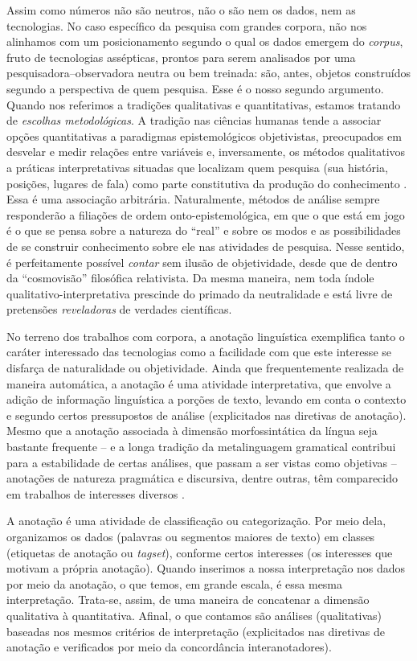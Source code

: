 \documentclass[portuguese]{textolivre}
\begin{document}
Assim como números não são neutros, não o são nem os dados, nem as tecnologias. No caso específico da pesquisa com grandes corpora, não nos alinhamos com um posicionamento segundo o qual os dados emergem do \textit{corpus}, fruto de tecnologias assépticas, prontos para serem analisados por uma pesquisadora–observadora neutra ou bem treinada: são, antes, objetos construídos segundo a perspectiva de quem pesquisa. Esse é o nosso segundo argumento. Quando nos referimos a tradições qualitativas e quantitativas, estamos tratando de \textit{escolhas metodológicas}. A tradição nas ciências humanas tende a associar opções quantitativas a paradigmas epistemológicos objetivistas, preocupados em desvelar e medir relações entre variáveis e, inversamente, os métodos qualitativos a práticas interpretativas situadas que localizam quem pesquisa (sua história, posições, lugares de fala) como parte constitutiva da produção do conhecimento \cite{denzin2006}. Essa é uma associação arbitrária. Naturalmente, métodos de análise sempre responderão a filiações de ordem onto-epistemológica, em que o que está em jogo é o que se pensa sobre a natureza do “real” e sobre os modos e as possibilidades de se construir conhecimento sobre ele nas atividades de pesquisa. Nesse sentido, é perfeitamente possível \textit{contar} sem ilusão de objetividade, desde que de dentro da “cosmovisão” filosófica relativista. Da mesma maneira, nem toda índole qualitativo-interpretativa prescinde do primado da neutralidade e está livre de pretensões \textit{reveladoras} de verdades científicas.

No terreno dos trabalhos com corpora, a anotação linguística exemplifica tanto o caráter interessado das tecnologias como a facilidade com que este interesse se disfarça de naturalidade ou objetividade.  Ainda que frequentemente realizada de maneira automática, a anotação é uma atividade interpretativa, que envolve a adição de informação linguística a porções de texto, levando em conta o contexto e segundo certos pressupostos de análise (explicitados nas diretivas de anotação). Mesmo que a anotação associada à dimensão morfossintática da língua seja bastante frequente – e a longa tradição da metalinguagem gramatical contribui para a estabilidade de certas análises, que passam a ser vistas como objetivas – anotações de natureza pragmática e discursiva, dentre outras, têm comparecido em trabalhos de interesses diversos \cite{ide2017}.

A anotação é uma atividade de classificação ou categorização. Por meio dela, organizamos os dados (palavras ou segmentos maiores de texto) em classes (etiquetas de anotação ou \textit{tagset}), conforme certos interesses (os interesses que motivam a própria anotação). Quando inserimos a nossa interpretação nos dados por meio da anotação, o que temos, em grande escala, é essa mesma interpretação. Trata-se, assim, de uma maneira de concatenar a dimensão qualitativa à quantitativa. Afinal, o que contamos são análises (qualitativas) baseadas nos mesmos critérios de interpretação (explicitados nas diretivas de anotação e verificados por meio da concordância interanotadores).
\end{document}
